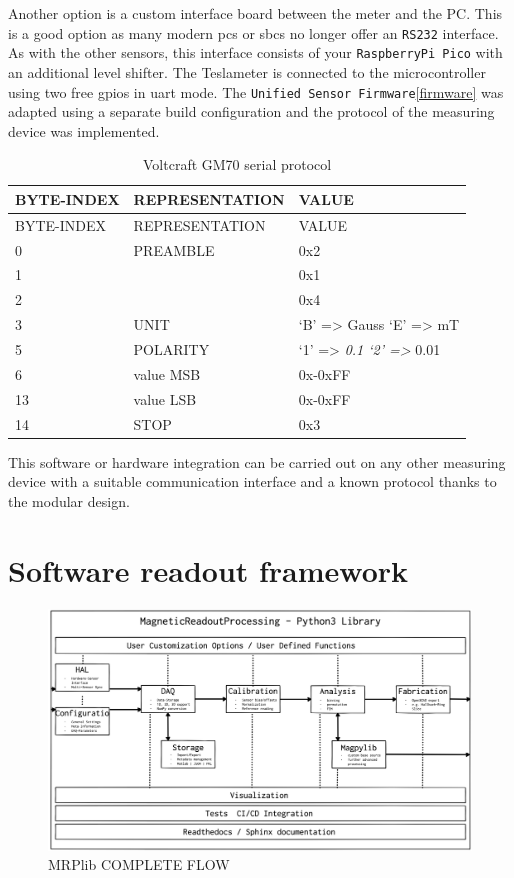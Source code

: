 Another option is a custom interface board between the meter and the PC.
This is a good option as many modern \gls{pc}s or \gls{sbc}s no longer
offer an \passthrough{\lstinline!RS232!} interface. As with the other
sensors, this interface consists of your
\passthrough{\lstinline!RaspberryPi Pico!} with an additional level
shifter. The Teslameter is connected to the microcontroller using two
free \gls{gpio}s in \gls{uart} mode. The
\passthrough{\lstinline!Unified Sensor Firmware!}\ref{firmware} was
adapted using a separate build configuration and the protocol of the
measuring device was implemented.

\begin{longtable}[]{@{}lll@{}}
\caption{Voltcraft GM70 serial protocol
\label{Voltcraft_GM70_serial_protocol.csv}}\tabularnewline
\toprule
BYTE-INDEX & REPRESENTATION & VALUE\tabularnewline
\midrule
\endfirsthead
\toprule
BYTE-INDEX & REPRESENTATION & VALUE\tabularnewline
\midrule
\endhead
0 & PREAMBLE & 0x2\tabularnewline
1 & & 0x1\tabularnewline
2 & & 0x4\tabularnewline
3 & UNIT & `B' =\textgreater{} Gauss `E' =\textgreater{}
mT\tabularnewline
5 & POLARITY & `1' =\textgreater{} \emph{0.1 `2' =\textgreater{}
}0.01\tabularnewline
6 & value MSB & 0x-0xFF\tabularnewline
13 & value LSB & 0x-0xFF\tabularnewline
14 & STOP & 0x3\tabularnewline
\bottomrule
\end{longtable}

This software or hardware integration can be carried out on any other
measuring device with a suitable communication interface and a known
protocol thanks to the modular design.

\hypertarget{software-readout-framework}{%
\chapter{Software readout framework}\label{software-readout-framework}}

\begin{figure}
\centering
\includegraphics{./generated_images/border_MRPlib_COMPLETE_FLOW.png}
\caption{MRPlib COMPLETE FLOW \label{MRPlib_COMPLETE_FLOW.png}}
\end{figure}

